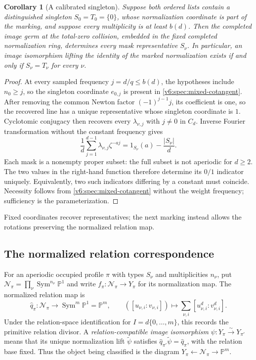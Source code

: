 \documentclass[10pt,fleqn]{article}
\numberwithin{equation}{section}
\newtheorem{corollary}[theorem]{Corollary}
\newcommand{\PP}{\mathbb P}
\newcommand{\sym}{\operatorname{Sym}}
\begin{document}
\begin{corollary}[A calibrated singleton]\label{v6:spec:singleton-marked}
Suppose both ordered lists contain a distinguished singleton
$S_0=T_0=\{0\}$, whose normalization coordinate is part of the marking,
and suppose every multiplicity is at least $b(d)$.  Then the completed
image germ at the total-zero collision, embedded in the fixed completed
normalization ring, determines every mask
representative $S_\nu$.  In particular, an image isomorphism lifting the
identity of the marked normalization exists if and only if
$S_\nu=T_\nu$ for every $\nu$.
\end{corollary}
\begin{proof}
At every sampled frequency $j=d/q\le b(d)$, the hypotheses include
$n_0\ge j$, so the singleton coordinate $e_{0,j}$ is present in
\eqref{v6:spec:mixed-cotangent}.
After removing the common Newton factor $(-1)^{j-1}j$,
its coefficient is one, so the recovered line has a unique
representative whose singleton coordinate is $1$.  Cyclotomic conjugacy then
recovers every $\lambda_{\nu,j}$ with $j\ne0$ in $C_d$.  Inverse Fourier transformation without the
constant frequency gives
\begin{equation}\label{v6:spec:fourier-inversion}
 \frac1d\sum_{j=1}^{d-1}\lambda_{\nu,j}\zeta^{-aj}
   =1_{S_\nu}(a)-\frac{|S_\nu|}{d}.
\end{equation}
Each mask is a nonempty proper subset: the full subset is not
aperiodic for $d\ge2$.  The two values in the right-hand function
therefore determine its $0/1$ indicator uniquely.  Equivalently, two
such indicators differing by a constant must coincide.  Necessity follows from \eqref{v6:spec:mixed-cotangent} without the
weight frequency; sufficiency is the parameterization.
\end{proof}

Fixed coordinates recover representatives; the next marking instead
allows the rotations preserving the normalized relation map.

\subsection{The normalized relation correspondence}
\label{r20:spec:relation-correspondence}

For an aperiodic occupied profile $\pi$ with types $S_\nu$ and
multiplicities $n_\nu$, put
$\mathcal N_\pi=\prod_\nu\sym^{n_\nu}\PP^1$ and write
$f_\pi:\mathcal N_\pi\longrightarrow Y_\pi$ for its normalization
map.  The normalized relation map is
\begin{equation}\label{v6:spec:relation-map}
 \widehat q_\pi:\mathcal N_\pi\longrightarrow\sym^m\PP^1=\PP^m,
 \qquad
 ([u_{\nu,i}:v_{\nu,i}])\longmapsto
 \sum_{\nu,i}[u_{\nu,i}^{d}:v_{\nu,i}^{d}].
\end{equation}
Under the relation-space identification for $I=d\{0,\ldots,m\}$,
this records the primitive relation divisor.  A
\emph{relation-compatible image isomorphism}
$\psi:Y_\pi\xrightarrow{\sim}Y_{\pi'}$ means that its unique
normalization lift $\widetilde\psi$ satisfies
$\widehat q_{\pi'}\widetilde\psi=\widehat q_\pi$, with the relation
base fixed.  Thus the object being classified is the diagram
$Y_\pi\longleftarrow\mathcal N_\pi\longrightarrow\PP^m$.
\end{document}
